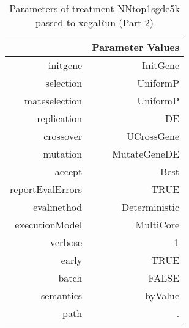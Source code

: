 \begin{table}[ht]
\centering
\begin{tabular}{rr}
  \hline
 & Parameter Values \\ 
  \hline
initgene & InitGene \\ 
  selection & UniformP \\ 
  mateselection & UniformP \\ 
  replication & DE \\ 
  crossover & UCrossGene \\ 
  mutation & MutateGeneDE \\ 
  accept & Best \\ 
  reportEvalErrors & TRUE \\ 
  evalmethod & Deterministic \\ 
  executionModel & MultiCore \\ 
  verbose & 1 \\ 
  early & TRUE \\ 
  batch & FALSE \\ 
  semantics & byValue \\ 
  path & . \\ 
   \hline
\end{tabular}
\caption{ Parameters of treatment NNtop1sgde5k passed to xegaRun
 (Part 2)} 
\end{table}
